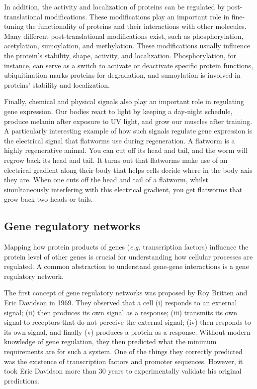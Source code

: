 In addition, the activity and localization of proteins can be regulated by post-translational modifications\cite{Ramazi2021}. These modifications play an important role in fine-tuning the functionality of proteins and their interactions with other molecules. Many different post-translational modifications exist, such as phosphorylation, acetylation, sumoylation, and methylation. These modifications usually influence the protein's stability, shape, activity, and localization. Phosphorylation, for instance, can serve as a switch to activate or deactivate specific protein functions\cite{Cohen2002}, ubiquitination marks proteins for degradation, and sumoylation is involved in proteins' stability and localization\cite{Mazur2012}.

Finally, chemical and physical signals also play an important role in regulating gene expression. Our bodies react to light by keeping a day-night schedule, produce melanin after exposure to UV light, and grow our muscles after training. A particularly interesting example of how such signals regulate gene expression is the electrical signal that flatworms use during regeneration. A flatworm is a highly regenerative animal. You can cut off its head and tail, and the worm will regrow back its head and tail. It turns out that flatworms make use of an electrical gradient along their body that helps cells decide where in the body axis they are. When one cuts off the head and tail of a flatworm, whilst simultaneously interfering with this electrical gradient, you get flatworms that grow back two heads or tails\cite{Levin2014}.

\subsection{Gene regulatory networks}

Mapping how protein products of genes (\textit{e.g.} transcription factors) influence the protein level of other genes is crucial for understanding how cellular processes are regulated. A common abstraction to understand gene-gene interactions is a gene regulatory network.

The first concept of gene regulatory networks was proposed by Roy Britten and Eric Davidson in 1969\cite{Britten_1969}. They observed that a cell (i) responds to an external signal; (ii) then produces its own signal as a response; (iii) transmits its own signal to receptors that do not perceive the external signal; (iv) then responds to its own signal, and finally (v) produces a protein as a response. Without modern knowledge of gene regulation, they then predicted what the minimum requirements are for such a system. One of the things they correctly predicted was the existence of transcription factors and promoter sequences. However, it took Eric Davidson more than 30 years to experimentally validate his original predictions\cite{Davidson_2002}.

